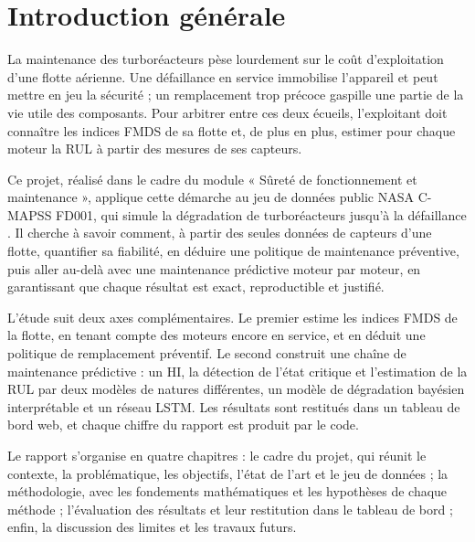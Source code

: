 \chapter*{Introduction générale}

La maintenance des turboréacteurs pèse lourdement sur le coût d'exploitation d'une flotte aérienne. Une défaillance en service immobilise l'appareil et peut mettre en jeu la sécurité ; un remplacement trop précoce gaspille une partie de la vie utile des composants. Pour arbitrer entre ces deux écueils, l'exploitant doit connaître les indices FMDS de sa flotte et, de plus en plus, estimer pour chaque moteur la RUL à partir des mesures de ses capteurs.

Ce projet, réalisé dans le cadre du module « Sûreté de fonctionnement et maintenance », applique cette démarche au jeu de données public NASA C-MAPSS FD001, qui simule la dégradation de turboréacteurs jusqu'à la défaillance \cite{saxena2008data,saxena2008damage}. Il cherche à savoir comment, à partir des seules données de capteurs d'une flotte, quantifier sa fiabilité, en déduire une politique de maintenance préventive, puis aller au-delà avec une maintenance prédictive moteur par moteur, en garantissant que chaque résultat est exact, reproductible et justifié.

L'étude suit deux axes complémentaires. Le premier estime les indices FMDS de la flotte, en tenant compte des moteurs encore en service, et en déduit une politique de remplacement préventif. Le second construit une chaîne de maintenance prédictive : un HI, la détection de l'état critique et l'estimation de la RUL par deux modèles de natures différentes, un modèle de dégradation bayésien interprétable et un réseau LSTM. Les résultats sont restitués dans un tableau de bord web, et chaque chiffre du rapport est produit par le code.

Le rapport s'organise en quatre chapitres : le cadre du projet, qui réunit le contexte, la problématique, les objectifs, l'état de l'art et le jeu de données ; la méthodologie, avec les fondements mathématiques et les hypothèses de chaque méthode ; l'évaluation des résultats et leur restitution dans le tableau de bord ; enfin, la discussion des limites et les travaux futurs.
